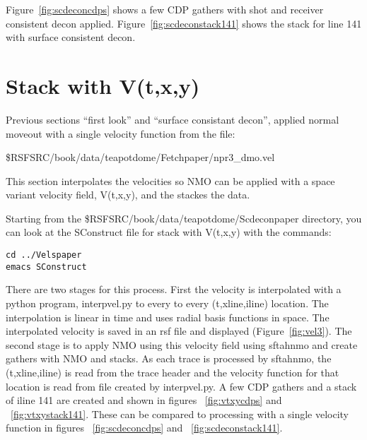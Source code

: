 Figure~\ref{fig:scdeconcdps} shows a few CDP gathers with shot and receiver consistent decon applied.  Figure~\ref{fig:scdeconstack141} shows the stack for line 141 with surface consistent decon.



\section{Stack with V(t,x,y)}

Previous sections ``first look'' and  ``surface consistant decon'', applied normal moveout  with a single velocity function from the file:

\$RSFSRC/book/data/teapotdome/Fetchpaper/npr3\_dmo.vel

This section interpolates the velocities so NMO can be applied with a space variant velocity field, V(t,x,y), and the stackes the data.

Starting from the \$RSFSRC/book/data/teapotdome/Scdeconpaper directory, you can look at the SConstruct file for stack with V(t,x,y) with the commands:
\begin{verbatim}  
cd ../Velspaper
emacs SConstruct
\end{verbatim}  

There are two stages for this process.  First the velocity is interpolated with a python program, interpvel.py to every to every (t,xline,iline) location.  The interpolation is linear in time and uses radial basis functions in space.  The interpolated velocity is saved in an rsf file and displayed (Figure~\ref{fig:vel3}). The second stage is to apply NMO using this velocity field using sftahnmo and create gathers with NMO and stacks.  As each trace is processed by sftahnmo, the (t,xline,iline) is read from the trace header and the velocity function for that location is read from file created by interpvel.py.  A few CDP gathers and a stack of iline 141 are created and shown in figures ~\ref{fig:vtxycdps} and ~\ref{fig:vtxystack141}.  These can be compared to processing with a single velocity function in figures ~\ref{fig:scdeconcdps} and ~\ref{fig:scdeconstack141}.


